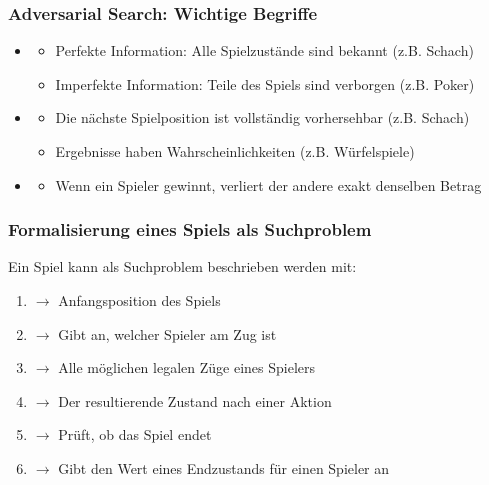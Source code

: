\subsubsection*{Adversarial Search: Wichtige Begriffe}
\begin{itemize}
    \item {}
    \begin{itemize}
        \item Perfekte Information: Alle Spielzustände sind bekannt (z.B. Schach)
        \item Imperfekte Information: Teile des Spiels sind verborgen (z.B. Poker)
    \end{itemize}
    \item {}
    \begin{itemize}
        \item {} Die nächste Spielposition ist vollständig vorhersehbar (z.B. Schach)
        \item {} Ergebnisse haben Wahrscheinlichkeiten (z.B. Würfelspiele)
    \end{itemize}
    \item {}
    \begin{itemize}
        \item Wenn ein Spieler gewinnt, verliert der andere exakt denselben Betrag
    \end{itemize}
\end{itemize}
\subsubsection*{Formalisierung eines Spiels als Suchproblem}
Ein Spiel kann als Suchproblem beschrieben werden mit:
\begin{enumerate}
    \item {} $\rightarrow$ Anfangsposition des Spiels
    \item {} $\rightarrow$ Gibt an, welcher Spieler am Zug ist
    \item {} $\rightarrow$ Alle möglichen legalen Züge eines Spielers
    \item {} $\rightarrow$ Der resultierende Zustand nach einer Aktion
    \item {} $\rightarrow$ Prüft, ob das Spiel endet
    \item {} $\rightarrow$ Gibt den Wert eines Endzustands für einen Spieler an
\end{enumerate}
